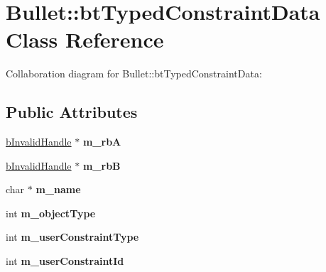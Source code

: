 \hypertarget{class_bullet_1_1bt_typed_constraint_data}{\section{Bullet\+:\+:bt\+Typed\+Constraint\+Data Class Reference}
\label{class_bullet_1_1bt_typed_constraint_data}
}


Collaboration diagram for Bullet\+:\+:bt\+Typed\+Constraint\+Data\+:
\subsection*{Public Attributes}
\begin{DoxyCompactItemize}
\item 
\hypertarget{class_bullet_1_1bt_typed_constraint_data_a651af743d1170c908d922aa5ba585d5f}{\hyperlink{struct_bullet_1_1b_invalid_handle}{b\+Invalid\+Handle} $\ast$ {\bfseries m\+\_\+rb\+A}}\label{class_bullet_1_1bt_typed_constraint_data_a651af743d1170c908d922aa5ba585d5f}

\item 
\hypertarget{class_bullet_1_1bt_typed_constraint_data_a91ac0e3f187f16ce67b5e3b87d463f5c}{\hyperlink{struct_bullet_1_1b_invalid_handle}{b\+Invalid\+Handle} $\ast$ {\bfseries m\+\_\+rb\+B}}\label{class_bullet_1_1bt_typed_constraint_data_a91ac0e3f187f16ce67b5e3b87d463f5c}

\item 
\hypertarget{class_bullet_1_1bt_typed_constraint_data_a28c02bce239fd496941a94152b24c55e}{char $\ast$ {\bfseries m\+\_\+name}}\label{class_bullet_1_1bt_typed_constraint_data_a28c02bce239fd496941a94152b24c55e}

\item 
\hypertarget{class_bullet_1_1bt_typed_constraint_data_aa975322a8433f486fc9ededb56bb642e}{int {\bfseries m\+\_\+object\+Type}}\label{class_bullet_1_1bt_typed_constraint_data_aa975322a8433f486fc9ededb56bb642e}

\item 
\hypertarget{class_bullet_1_1bt_typed_constraint_data_a4b6bc0cb759687984f9153e1512dc3ec}{int {\bfseries m\+\_\+user\+Constraint\+Type}}\label{class_bullet_1_1bt_typed_constraint_data_a4b6bc0cb759687984f9153e1512dc3ec}

\item 
\hypertarget{class_bullet_1_1bt_typed_constraint_data_ad134d2d2fd3f277c22b112d503ac39f8}{int {\bfseries m\+\_\+user\+Constraint\+Id}}\label{class_bullet_1_1bt_typed_constraint_data_ad134d2d2fd3f277c22b112d503ac39f8}


\end{DoxyCompactItemize}
